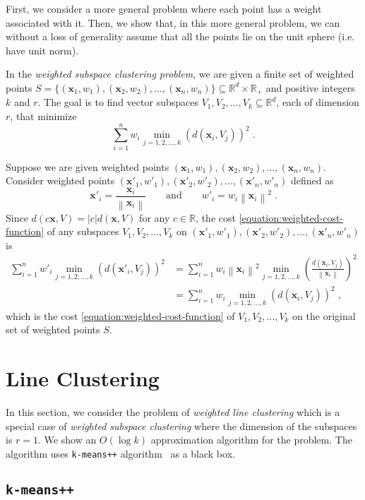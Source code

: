 \documentclass[12pt]{article}
\newcommand{\R}{\mathbb{R}}
\newcommand{\norm}[1]{\left\|#1\right\|}
\newcommand{\x}{\mathbf{x}}
\begin{document}
First, we consider a more general problem where each point has a weight
associated with it. Then, we show that, in this more general problem, we can
without a loss of generality assume that all the points lie on the unit sphere
(i.e. have unit norm).

In the \emph{weighted subspace clustering problem}, we are given a finite set
of weighted points $S = \{ (\x_1, w_1), (\x_2, w_2), \dots, (\x_n, w_n) \}
\subseteq \R^d \times \R_+$ and positive integers $k$ and $r$. The goal is to
find vector subspaces $V_1, V_2, \dots, V_k \subseteq \R^d$, each of dimension
$r$, that minimize
\begin{equation}
\label{equation:weighted-cost-function}
\sum_{i=1}^n w_i \min_{j=1,2,\dots,k} \left(d(\x_i, V_j)\right)^2 \; .
\end{equation}

Suppose we are given weighted points $(\x_1, w_1), (\x_2, w_2), \dots, (\x_n,
w_n)$. Consider weighted points $(\x'_1, w'_1), (\x'_2, w'_2), \dots, (\x'_n,
w'_n)$ defined as
$$
\x'_i = \frac{\x_i}{\norm{\x_i}} \qquad \text{and} \qquad
w'_i = w_i \norm{\x_i}^2 \; .
$$
Since $d(c \x, V) = |c| d(\x,V)$ for any $c \in \R$, the cost
\eqref{equation:weighted-cost-function} of any subspaces $V_1, V_2, \dots, V_k$
on $(\x'_1, w'_1), (\x'_2, w'_2), \dots, (\x'_n, w'_n)$ is
\begin{align*}
\sum_{i=1}^n w'_i \min_{j=1,2,\dots,k} \left(d(\x'_i, V_j)\right)^2
& = \sum_{i=1}^n w_i \norm{\x_i}^2 \min_{j=1,2,\dots,k} \left( \frac{d(\x_i, V_j)}{\norm{\x_i}} \right)^2 \\
& = \sum_{i=1}^n w_i \min_{j=1,2,\dots,k} \left( d(\x_i, V_j) \right)^2 \; ,
\end{align*}
which is the cost \eqref{equation:weighted-cost-function}
of $V_1, V_2, \dots, V_k$ on the original set of weighted points $S$.

\section{Line Clustering}
\label{section:line-clustering}

In this section, we consider the problem of \emph{weighted line clustering}
which is a special case of \emph{weighted subspace clustering} where the
dimension of the subspaces is $r=1$. We show an $O(\log k)$ approximation
algorithm for the problem. The algorithm uses \texttt{k-means++}
algorithm~\cite{Arthur-Vassilvitskii-2007} as a black box.

\subsection{\texttt{k-means++}}
\end{document}
